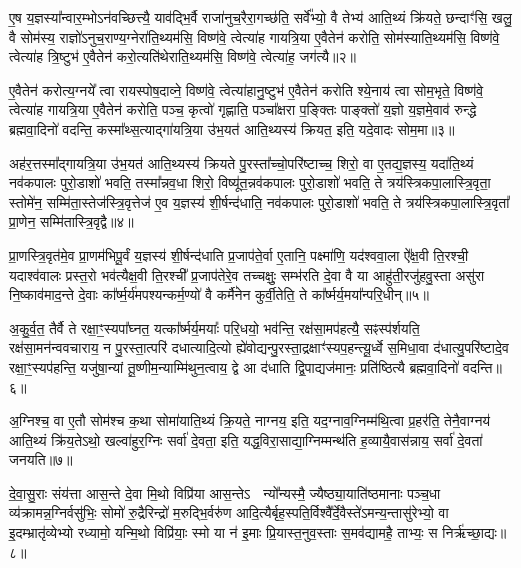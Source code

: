 ए॒ष य॒ज्ञस्या᳚न्वार॒म्भो\-ऽन॑वच्छित्त्यै॒ याव॑द्भि॒र्वै राजा॑नुच॒रैरा॒गच्छ॑ति॒ सर्वे᳚भ्यो॒ वै तेभ्य॑ आति॒थ्यं क्रि॑यते॒ छन्दाꣳ॑सि॒ खलु॒ वै सोम॑स्य॒ राज्ञो॑\-ऽनुच॒राण्य॒ग्नेरा॑ति॒थ्यम॑सि॒ विष्ण॑वे॒ त्वेत्या॑ह गायत्रि॒या ए॒वैतेन॑ करोति॒ सोम॑स्याति॒थ्यम॑सि॒ विष्ण॑वे॒ त्वेत्या॑ह त्रि॒ष्टुभ॑ ए॒वैतेन॑ करो॒त्यति॑थेराति॒थ्यम॑सि॒ विष्ण॑वे॒ त्वेत्या॑ह॒ जग॑त्यै॥२॥

ए॒वैतेन॑ करोत्य॒ग्नये᳚ त्वा रायस्पोष॒दाव्ने॒ विष्ण॑वे॒ त्वेत्या॑हानु॒ष्टुभ॑ ए॒वैतेन॑ करोति श्ये॒नाय॑ त्वा सोम॒भृते॒ विष्ण॑वे॒ त्वेत्या॑ह गायत्रि॒या ए॒वैतेन॑ करोति॒ पञ्च॒ कृत्वो॑ गृह्णाति॒ पञ्चा᳚क्षरा प॒ङ्क्तिः पाङ्क्तो॑ य॒ज्ञो य॒ज्ञमे॒वाव॑ रुन्द्धे ब्रह्मवा॒दिनो॑ वदन्ति॒ कस्मा᳚थ्स॒त्याद्गा॑यत्रि॒या उ॑भ॒यत॑ आति॒थ्यस्य॑ क्रियत॒ इति॒ यदे॒वादः सोम॒मा॥३॥

अह॑र॒त्तस्मा᳚द्गायत्रि॒या उ॑भ॒यत॑ आति॒थ्यस्य॑ क्रियते पु॒रस्ता᳚च्चो॒परि॑ष्टाच्च॒ शिरो॒ वा ए॒तद्य॒ज्ञस्य॒ यदा॑ति॒थ्यं नव॑कपालः पुरो॒डाशो॑ भवति॒ तस्मा᳚न्नव॒धा शिरो॒ विष्यू॑त॒न्नव॑कपालः पुरो॒डाशो॑ भवति॒ ते त्रय॑स्त्रिकपा॒लास्त्रि॒वृता॒ स्तोमे॑न॒ सम्मि॑ता॒स्तेज॑स्त्रि॒वृत्तेज॑ ए॒व य॒ज्ञस्य॑ शी॒र्\mbox{}षन्द॑धाति॒ नव॑कपालः पुरो॒डाशो॑ भवति॒ ते त्रय॑स्त्रिकपा॒लास्त्रि॒वृता᳚ प्रा॒णेन॒ सम्मि॑तास्त्रि॒वृद्वै॥४॥

प्रा॒णस्त्रि॒वृत॑मे॒व प्रा॒णम॑भिपू॒र्वं य॒ज्ञस्य॑ शी॒र्\mbox{}षन्द॑धाति प्र॒जाप॑ते॒र्वा ए॒तानि॒ पक्ष्मा॑णि॒ यद॑श्ववा॒ला ऐ᳚क्ष॒वी ति॒रश्ची॒ यदाश्व॑वालः प्रस्त॒रो भव॑त्यैक्ष॒वी ति॒रश्ची᳚ प्र॒जाप॑तेरे॒व तच्चक्षुः॒ सम्भ॑रति दे॒वा वै या आहु॑ती॒रजु॑हवु॒स्ता असु॑रा नि॒ष्काव॑माद॒न्ते दे॒वाः का᳚र्\mbox{}ष्म॒र्य॑मपश्यन्कर्म॒ण्यो॑ वै कर्मै॑नेन कुर्वी॒तेति॒ ते का᳚र्ष्मर्य॒मया᳚न्परि॒धीन्॥५॥

अ॒कु॒र्व॒त॒ तैर्वै ते रक्षा॒ꣳ॒स्यपा᳚घ्नत॒ यत्का᳚र्ष्मर्य॒मयाः᳚ परि॒धयो॒ भव॑न्ति॒ रक्ष॑सा॒मप॑हत्यै॒ सꣴस्प॑र्शयति॒ रक्ष॑सा॒मन॑न्ववचाराय॒ न पु॒रस्ता॒त्परि॑ दधात्यादि॒त्यो ह्ये॑वोद्यन्पु॒रस्ता॒द्रक्षाꣳ॑स्यप॒हन्त्यू॒र्ध्वे स॒मिधा॒वा द॑धात्यु॒परि॑ष्टादे॒व रक्षा॒ꣳ॒स्यप॑हन्ति॒ यजु॑षा॒न्यां तू॒ष्णीम॒न्याम्मि॑थुन॒त्वाय॒ द्वे आ द॑धाति द्वि॒पाद्यज॑मानः॒ प्रति॑ष्ठित्यै ब्रह्मवा॒दिनो॑ वदन्ति॥६॥

अ॒ग्निश्च॒ वा ए॒तौ सोम॑श्च क॒था सोमा॑याति॒थ्यं क्रि॒यते॒ नाग्नय॒ इति॒ यद॒ग्नाव॒ग्निम्म॑थि॒त्वा प्र॒हर॑ति॒ तेनै॒वाग्नय॑ आति॒थ्यं क्रि॑य॒ते\-ऽथो॒ खल्वा॑हुर॒ग्निः सर्वा॑ दे॒वता॒ इति॒ यद्ध॒विरा॒साद्या॒ग्निम्मन्थ॑ति ह॒व्यायै॒वास॑न्नाय॒ सर्वा॑ दे॒वता॑ जनयति॥७॥

{\anuvakamend[{पत्नि॑या ए॒व जग॑त्या॒ आ त्रि॒वृद्वै प॑रि॒धीन् व॑द॒न्त्येक॑चत्वारिꣳशच्च॥१॥}]}

दे॒वा॒सु॒राः संय॑त्ता आस॒न्ते दे॒वा मि॒थो विप्रि॑या आस॒न्ते\-ऽ  न्यो᳚न्यस्मै॒ ज्यैष्ठ्या॒याति॑ष्ठमानाः पञ्च॒धा व्य॑क्रामन्न॒ग्नि\-र्वसु॑भिः॒ सोमो॑ रु॒द्रैरिन्द्रो॑ म॒रुद्भि॒र्वरु॑ण आदि॒त्यैर्बृह॒स्पति॒र्विश्वै᳚र्दे॒वैस्ते॑\-ऽमन्य॒न्तासु॑रेभ्यो॒ वा इ॒दम्भ्रातृ॑व्येभ्यो रध्यामो॒ यन्मि॒थो विप्रि॑याः॒ स्मो या न॑ इ॒माः प्रि॒यास्त॒नुव॒स्ताः स॒मव॑द्यामहै॒ ताभ्यः॒ स निर्\mbox{}ऋ॑च्छा॒द्यः॥८॥


